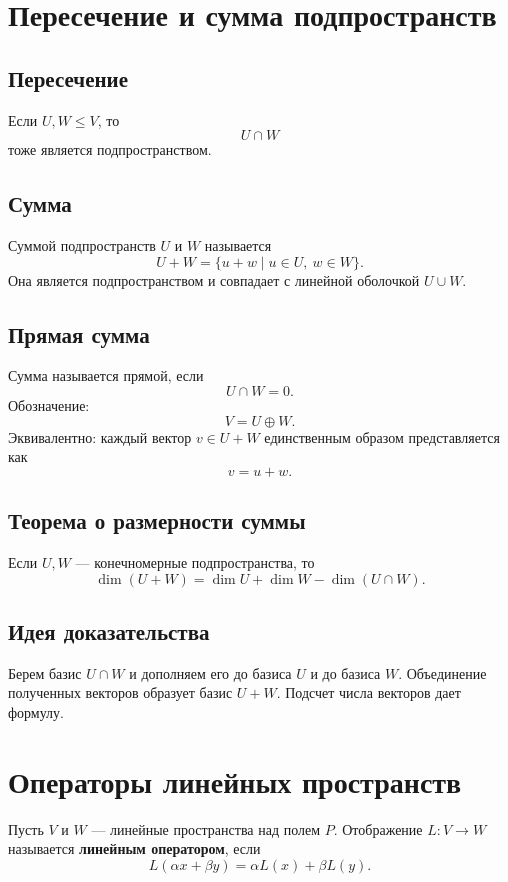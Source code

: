 \documentclass[12pt,a4paper]{article}
\begin{document}
\section{Пересечение и сумма подпространств}

\subsection*{Пересечение}

Если $U,W\le V$, то
\[
    U\cap W
\]
тоже является подпространством.

\subsection*{Сумма}

Суммой подпространств $U$ и $W$ называется
\[
    U+W=\{u+w\mid u\in U,\ w\in W\}.
\]
Она является подпространством и совпадает с линейной оболочкой $U\cup W$.

\subsection*{Прямая сумма}

Сумма называется прямой, если
\[
    U\cap W=0.
\]
Обозначение:
\[
    V=U\oplus W.
\]
Эквивалентно: каждый вектор $v\in U+W$ единственным образом представляется как
\[
    v=u+w.
\]

\subsection*{Теорема о размерности суммы}

Если $U,W$ --- конечномерные подпространства, то
\[
    \dim(U+W)=\dim U+\dim W-\dim(U\cap W).
\]

\subsection*{Идея доказательства}

Берем базис $U\cap W$ и дополняем его до базиса $U$ и до базиса $W$. Объединение полученных векторов образует базис $U+W$. Подсчет числа векторов дает формулу.

\section{Операторы линейных пространств}

Пусть $V$ и $W$ --- линейные пространства над полем $P$. Отображение $L:V\to W$ называется \textbf{линейным оператором}, если
\[
    L(\alpha x+\beta y)=\alpha L(x)+\beta L(y).
\]
\end{document}
